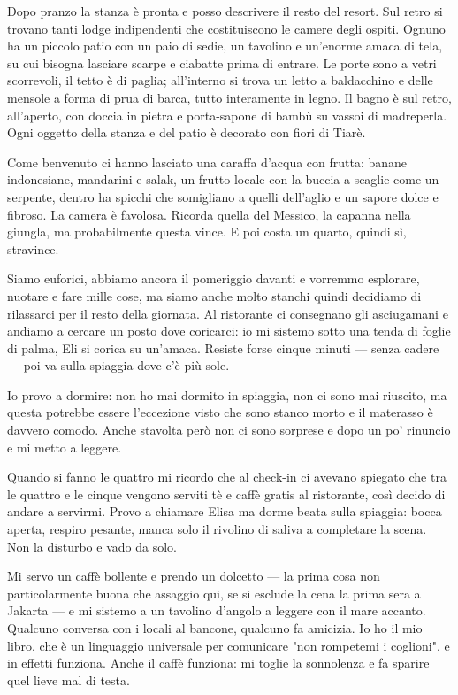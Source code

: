 Dopo pranzo la stanza è pronta e posso descrivere il resto del resort. Sul retro si trovano tanti lodge indipendenti che costituiscono le camere degli ospiti. Ognuno ha un piccolo patio con un paio di sedie, un tavolino e un'enorme amaca di tela, su cui bisogna lasciare scarpe e ciabatte prima di entrare. Le porte sono a vetri scorrevoli, il tetto è di paglia; all'interno si trova un letto a baldacchino e delle mensole a forma di prua di barca, tutto interamente in legno. Il bagno è sul retro, all'aperto, con doccia in pietra e porta-sapone di bambù su vassoi di madreperla. Ogni oggetto della stanza e del patio è decorato con fiori di Tiarè.

Come benvenuto ci hanno lasciato una caraffa d'acqua con frutta: banane indonesiane, mandarini e salak, un frutto locale con la buccia a scaglie come un serpente, dentro ha spicchi che somigliano a quelli dell'aglio e un sapore dolce e fibroso. La camera è favolosa. Ricorda quella del Messico, la capanna nella giungla, ma probabilmente questa vince. E poi costa un quarto, quindi sì, stravince.

Siamo euforici, abbiamo ancora il pomeriggio davanti e vorremmo esplorare, nuotare e fare mille cose, ma siamo anche molto stanchi quindi decidiamo di rilassarci per il resto della giornata. Al ristorante ci consegnano gli asciugamani e andiamo a cercare un posto dove coricarci: io mi sistemo sotto una tenda di foglie di palma, Eli si corica su un'amaca. Resiste forse cinque minuti — senza cadere — poi va sulla spiaggia dove c'è più sole.

Io provo a dormire: non ho mai dormito in spiaggia, non ci sono mai riuscito, ma questa potrebbe essere l'eccezione visto che sono stanco morto e il materasso è davvero comodo. Anche stavolta però non ci sono sorprese e dopo un po' rinuncio e mi metto a leggere.

Quando si fanno le quattro mi ricordo che al check-in ci avevano spiegato che tra le quattro e le cinque vengono serviti tè e caffè gratis al ristorante, così decido di andare a servirmi. Provo a chiamare Elisa ma dorme beata sulla spiaggia: bocca aperta, respiro pesante, manca solo il rivolino di saliva a completare la scena. Non la disturbo e vado da solo.

Mi servo un caffè bollente e prendo un dolcetto — la prima cosa non particolarmente buona che assaggio qui, se si esclude la cena la prima sera a Jakarta — e mi sistemo a un tavolino d'angolo a leggere con il mare accanto. Qualcuno conversa con i locali al bancone, qualcuno fa amicizia. Io ho il mio libro, che è un linguaggio universale per comunicare "non rompetemi i coglioni", e in effetti funziona. Anche il caffè funziona: mi toglie la sonnolenza e fa sparire quel lieve mal di testa.

